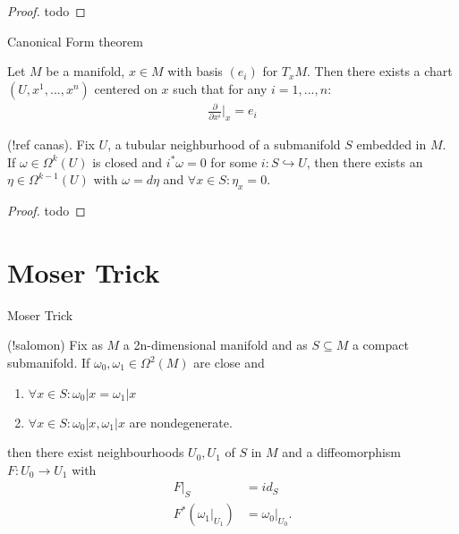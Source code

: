 \begin{proposition}

\end{proposition}

\begin{proof}
todo
\end{proof}

\begin{theorem}\label{canform}
Canonical Form theorem
\end{theorem}

\begin{lemma}\label{auxprop1}
Let $M$ be a manifold, $x \in M$ with basis $(e_i)$ for $T_x M$. Then there exists a chart $(U, x^1, ... ,x^n)$ centered on $x$ such that for any $i = 1, ... , n$:
\begin{align*}
\frac{\partial}{\partial x^i} \bigg\vert_x = e_i
\end{align*}
\end{lemma}

\begin{proposition} (!ref canas).
Fix $U$, a tubular neighburhood of a submanifold $S$ embedded in $M$. If $\omega \in \Omega^k(U)$ is closed and $i^* \omega = 0$ for some $i : S \hookrightarrow U$, then there exists an $\eta \in \Omega^{k-1}(U)$ with $\omega = d\eta$ and $\forall x \in S: \eta_x = 0$.
\end{proposition}

\begin{proof}
todo
\end{proof}

\section{Moser Trick}

\begin{theorem}
Moser Trick
\end{theorem}


\begin{theorem}\label{mosiso}
(!salomon)
Fix as $M$ a 2n-dimensional manifold and as $S \subseteq M$ a compact submanifold. If $\omega_0 , \omega_1 \in \Omega^2(M)$ are close and
\begin{enumerate}
\item $\forall x \in S: \omega_0|x = \omega_1|x$
\item $\forall x \in S: \omega_0|x, \omega_1|x$ are nondegenerate.
\end{enumerate}
then there exist neighbourhoods $U_0,U_1$ of $S$ in $M$ and a diffeomorphism $F: U_0 \to U_1$ with
\begin{align*}
F|_S &= id_S \\
F^*(\omega_1|_{U_1}) &= \omega_0|_{U_0}.
\end{align*}
\end{theorem}

